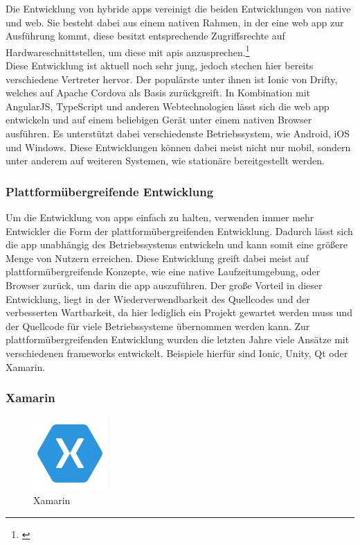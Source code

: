 Die Entwicklung von hybride \glspl{app} vereinigt die beiden Entwicklungen von native und web. Sie besteht dabei aus einem nativen Rahmen, in der eine web \gls{app} zur Ausführung kommt, diese besitzt entsprechende Zugriffsrechte auf Hardwareschnittstellen, um diese mit \glspl{api} anzusprechen.\footnote{\citep[vgl.][Native App, Web App und Hybrid App im Überblick]{PetraRiepe.NativeApp}\label{note2}}\\
Diese Entwicklung ist aktuell noch sehr jung, jedoch stechen hier bereits verschiedene Vertreter hervor. Der populärste unter ihnen ist Ionic von Drifty, welches auf Apache Cordova als Basis zurückgreift. In Kombination mit AngularJS, TypeScript und anderen Webtechnologien lässt sich die web \gls{app} entwickeln und auf einem beliebigen Gerät unter einem nativen Browser ausführen. Es unterstützt dabei verschiedenste Betriebssystem, wie Android, iOS und Windows. Diese Entwicklungen können dabei meist nicht nur mobil, sondern unter anderem auf weiteren Systemen, wie stationäre bereitgestellt werden.

\subsubsection{Plattformübergreifende Entwicklung}

Um die Entwicklung von \glspl{app} einfach zu halten, verwenden immer mehr Entwickler die Form der plattformübergreifenden Entwicklung. Dadurch lässt sich die \gls{app} unabhängig des Betriebssystems entwickeln und kann somit eine größere Menge von Nutzern erreichen. Diese Entwicklung greift dabei meist auf plattformübergreifende Konzepte, wie eine native Laufzeitumgebung, oder Browser zurück, um darin die \gls{app} auszuführen. Der große Vorteil in dieser Entwicklung, liegt in der Wiederverwendbarkeit des Quellcodes und der verbesserten Wartbarkeit, da hier lediglich ein Projekt gewartet werden muss und der Quellcode für viele Betriebssysteme übernommen werden kann. Zur plattformübergreifenden Entwicklung wurden die letzten Jahre viele Ansätze mit verschiedenen \glspl{framework} entwickelt. Beispiele hierfür sind Ionic, Unity, Qt oder Xamarin.\\
\newpage
\subsubsection{Xamarin}

\begin{figure}
	\begin{center}
		\includegraphics[width=0.25\textwidth]{images/technische_grundlagen/xamarin.png}
	\end{center}
	\caption{Xamarin}
	\label{fig:xamarin}
\end{figure}

